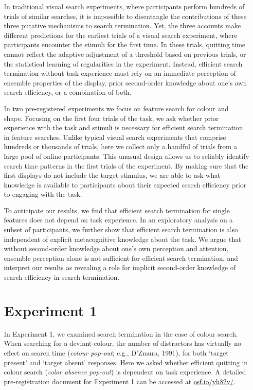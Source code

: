 \documentclass[12pt,twoside]{reedthesis}
\begin{document}
In traditional visual search experiments, where participants perform hundreds of trials of similar searches, it is impossible to disentangle the contributions of these three putative mechanisms to search termination. Yet, the three accounts make different predictions for the earliest trials of a visual search experiment, where participants encounter the stimuli for the first time. In these trials, quitting time cannot reflect the adaptive adjustment of a threshold based on previous trials, or the statistical learning of regularities in the experiment. Instead, efficient search termination without task experience must rely on an immediate perception of ensemble properties of the display, prior second-order knowledge about one's own search efficiency, or a combination of both.

In two pre-registered experiments we focus on feature search for colour and shape. Focusing on the first four trials of the task, we ask whether prior experience with the task and stimuli is necessary for efficient search termination in feature searches. Unlike typical visual search experiments that comprise hundreds or thousands of trials, here we collect only a handful of trials from a large pool of online participants. This unusual design allows us to reliably identify search time patterns in the first trials of the experiment. By making sure that the first displays do not include the target stimulus, we are able to ask what knowledge is available to participants about their expected search efficiency prior to engaging with the task.

To anticipate our results, we find that efficient search termination for single features does not depend on task experience. In an exploratory analysis on a subset of participants, we further show that efficient search termination is also independent of explicit metacognitive knowledge about the task. We argue that without second-order knowledge about one's own perception and attention, ensemble perception alone is not sufficient for efficient search termination, and interpret our results as revealing a role for implicit second-order knowledge of search efficiency in search termination.

\hypertarget{experiment-1}{%
\section{Experiment 1}\label{experiment-1}}

In Experiment 1, we examined search termination in the case of colour search. When searching for a deviant colour, the number of distractors has virtually no effect on search time (\emph{colour pop-out}; e.g., D'Zmura, 1991), for both `target present' and `target absent' responses. Here we asked whether efficient quitting in colour search (\emph{color absence pop-out}) is dependent on task experience. A detailed pre-registration document for Experiment 1 can be accessed at \url{osf.io/yh82v/}.
\end{document}
